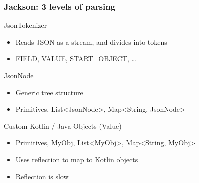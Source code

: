 \documentclass{beamer}
\begin{document}
    \begin{frame}
        \frametitle{Jackson: 3 levels of parsing}

        \begin{block}{JsonTokenizer}
            \begin{itemize}
                \item Reads JSON as a stream, and divides into tokens
                \item FIELD, VALUE, START\_OBJECT, \ldots
            \end{itemize}
        \end{block}

        \begin{block}{JsonNode}
            \begin{itemize}
                \item Generic tree structure
                \item Primitives, List<JsonNode>, Map<String, JsonNode>
            \end{itemize}
        \end{block}

        \begin{block}{Custom Kotlin / Java Objects (Value)}
            \begin{itemize}
                \item Primitives, MyObj, List<MyObj>, Map<String, MyObj>
                \item Uses reflection to map to Kotlin objects
                \item Reflection is slow
            \end{itemize}
        \end{block}
    \end{frame}


\end{document}
